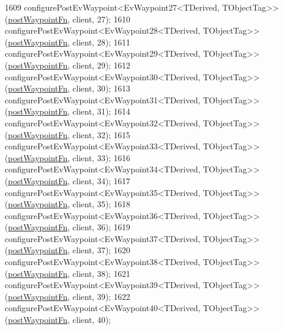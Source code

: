 \begin{DoxyCode}
1609     configurePostEvWaypoint<EvWaypoint27<TDerived, TObjectTag>>(\hyperlink{classcl__move__base__z_1_1WaypointEventDispatcher_a964a57fcce5d48ec60243230722d8dd7}{postWaypointFn}, client, 27);
1610     configurePostEvWaypoint<EvWaypoint28<TDerived, TObjectTag>>(\hyperlink{classcl__move__base__z_1_1WaypointEventDispatcher_a964a57fcce5d48ec60243230722d8dd7}{postWaypointFn}, client, 28);
1611     configurePostEvWaypoint<EvWaypoint29<TDerived, TObjectTag>>(\hyperlink{classcl__move__base__z_1_1WaypointEventDispatcher_a964a57fcce5d48ec60243230722d8dd7}{postWaypointFn}, client, 29);
1612     configurePostEvWaypoint<EvWaypoint30<TDerived, TObjectTag>>(\hyperlink{classcl__move__base__z_1_1WaypointEventDispatcher_a964a57fcce5d48ec60243230722d8dd7}{postWaypointFn}, client, 30);
1613     configurePostEvWaypoint<EvWaypoint31<TDerived, TObjectTag>>(\hyperlink{classcl__move__base__z_1_1WaypointEventDispatcher_a964a57fcce5d48ec60243230722d8dd7}{postWaypointFn}, client, 31);
1614     configurePostEvWaypoint<EvWaypoint32<TDerived, TObjectTag>>(\hyperlink{classcl__move__base__z_1_1WaypointEventDispatcher_a964a57fcce5d48ec60243230722d8dd7}{postWaypointFn}, client, 32);
1615     configurePostEvWaypoint<EvWaypoint33<TDerived, TObjectTag>>(\hyperlink{classcl__move__base__z_1_1WaypointEventDispatcher_a964a57fcce5d48ec60243230722d8dd7}{postWaypointFn}, client, 33);
1616     configurePostEvWaypoint<EvWaypoint34<TDerived, TObjectTag>>(\hyperlink{classcl__move__base__z_1_1WaypointEventDispatcher_a964a57fcce5d48ec60243230722d8dd7}{postWaypointFn}, client, 34);
1617     configurePostEvWaypoint<EvWaypoint35<TDerived, TObjectTag>>(\hyperlink{classcl__move__base__z_1_1WaypointEventDispatcher_a964a57fcce5d48ec60243230722d8dd7}{postWaypointFn}, client, 35);
1618     configurePostEvWaypoint<EvWaypoint36<TDerived, TObjectTag>>(\hyperlink{classcl__move__base__z_1_1WaypointEventDispatcher_a964a57fcce5d48ec60243230722d8dd7}{postWaypointFn}, client, 36);
1619     configurePostEvWaypoint<EvWaypoint37<TDerived, TObjectTag>>(\hyperlink{classcl__move__base__z_1_1WaypointEventDispatcher_a964a57fcce5d48ec60243230722d8dd7}{postWaypointFn}, client, 37);
1620     configurePostEvWaypoint<EvWaypoint38<TDerived, TObjectTag>>(\hyperlink{classcl__move__base__z_1_1WaypointEventDispatcher_a964a57fcce5d48ec60243230722d8dd7}{postWaypointFn}, client, 38);
1621     configurePostEvWaypoint<EvWaypoint39<TDerived, TObjectTag>>(\hyperlink{classcl__move__base__z_1_1WaypointEventDispatcher_a964a57fcce5d48ec60243230722d8dd7}{postWaypointFn}, client, 39);
1622     configurePostEvWaypoint<EvWaypoint40<TDerived, TObjectTag>>(\hyperlink{classcl__move__base__z_1_1WaypointEventDispatcher_a964a57fcce5d48ec60243230722d8dd7}{postWaypointFn}, client, 40);

\end{DoxyCode}
